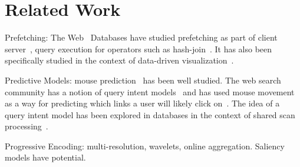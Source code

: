 \section{Related Work}

Prefetching: The Web~\cite{domenech2006web,nanopoulos2003data}
Databases have studied prefetching as part of client server~\cite{ramachandran2005dynamic,ramachandraholistic,sapia2000promise,smith1978sequentiality}, 
query execution for operators such as hash-join~\cite{chen2007improving}.
It has also been specifically studied in the context of data-driven visualization~\cite{jayachandran2014combining,battle2013scalar,battle2016dynamic,cetintemel2013query,debrabant2015seer}.

Predictive Models: mouse prediction~\cite{pasqual2014mouse,lane2005process,wobbrock2009angle,wobbrock2007gestures} has been well studied.
The web search community has a notion of query intent models~\cite{li2008learning} and has used mouse movement as a way for predicting which links a user will likely click on~\cite{guo2008exploring}.
The idea of a query intent model has been explored in databases in the context of shared scan processing~\cite{ebenstein2016fluxquery}.

Progressive Encoding: multi-resolution, wavelets, online aggregation.
Saliency models have potential.
